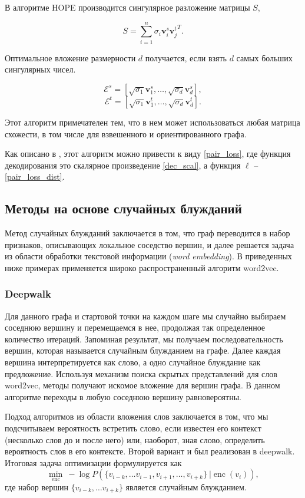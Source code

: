 \documentclass[12pt,a4paper]{extarticle}
\newcommand{\E}{\mathcal{E}}
\newcommand{\encoder}{\operatorname{enc}}
\begin{document}
    В алгоритме HOPE производится сингулярное разложение матрицы $S$,
    
    \[
    S = \sum_{i=1}^{n} \sigma_i \mathbf{v}_i^s {\mathbf{v}_j^t}^T.
    \]
    
    Оптимальное вложение размерности $d$ получается, если взять $d$ самых больших сингулярных чисел.
    
    \[
    \E^s = [ \sqrt{\sigma_1} \mathbf{v}_1^s, \ldots, \sqrt{\sigma_d} \mathbf{v}_d^s],
    \]
    \[
    \E^t = [ \sqrt{\sigma_1} \mathbf{v}_1^t, \ldots, \sqrt{\sigma_d} \mathbf{v}_d^t].
    \]
    
    Этот алгоритм примечателен тем, что в нем может использоваться любая матрица схожести, в том числе для взвешенного и ориентированного графа.
    
    Как описано в \cite{survey2}, этот алгоритм можно привести к виду \eqref{pair_loss}, где функция декодирования это скалярное произведение \eqref{dec_scal}, а функция $\ell$ -- \eqref{pair_loss_dist}.
    
    \subsection{Методы на основе случайных блужданий}
    Метод случайных блужданий заключается в том, что граф переводится в набор признаков, описывающих локальное соседство вершин, и далее решается задача из области обработки текстовой информации (\textit{word embedding}). В приведенных ниже примерах применяется широко распространенный алгоритм word2vec.
    
    \subsubsection{Deepwalk \cite{deepwalk}}
    Для данного графа и стартовой точки на каждом шаге мы случайно выбираем соседнюю вершину и перемещаемся в нее, продолжая так определенное количество итераций.
    Запоминая результат, мы получаем последовательность вершин, которая называется случайным блужданием на графе.
    Далее каждая вершина интерпретируется как слово, а одно случайное блуждание как предложение.
    Используя механизм поиска скрытых представлений для слов word2vec, методы получают искомое вложение для вершин графа.
    В данном алгоритме переходы в любую соседнюю вершину равновероятны.
    
    Подход алгоритмов из области вложения слов заключается в том, что мы подсчитываем вероятность встретить слово, если известен его контекст (несколько слов до и после него) или, наоборот, зная слово, определить вероятность слов в его контексте. Второй вариант и был реализован в deepwalk. Итоговая задача оптимизации формулируется как
    \[
    \min_{\encoder}\ - \log P(\{v_{i-k}, \dots v_{i-1}, v_{i+1}, \dots, v_{i+k}\}\ | \encoder(v_i)),
    \]
    где набор вершин $\{v_{i-k}, \dots v_{i+k}\}$ является случайным блужданием.
    
\end{document}

